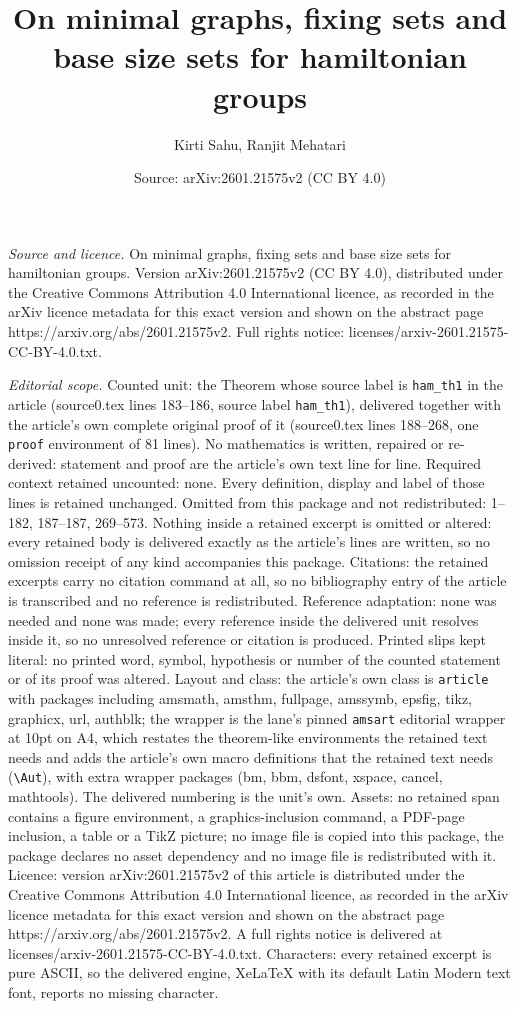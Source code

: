 \documentclass[10pt,a4paper]{amsart}
\title[On minimal graphs, fixing sets and base size sets for hamilt]{On minimal graphs, fixing sets and base size sets for hamiltonian groups}
\author{Kirti Sahu, Ranjit Mehatari}
\date{Source: arXiv:2601.21575v2 (CC BY 4.0)}
\begin{document}
\maketitle

\noindent\emph{Source and licence.} On minimal graphs, fixing sets and base size sets for hamiltonian groups. Version arXiv:2601.21575v2 (CC BY 4.0), distributed under the Creative Commons Attribution 4.0 International licence, as recorded in the arXiv licence metadata for this exact version and shown on the abstract page https://arxiv.org/abs/2601.21575v2. Full rights notice: licenses/arxiv-2601.21575-CC-BY-4.0.txt.\par\smallskip

\noindent\textit{Editorial scope.} Counted unit: the Theorem whose source label is \texttt{ham\_th1} in the article (source0.tex lines 183--186, source label \texttt{ham\_th1}), delivered together with the article's own complete original proof of it (source0.tex lines 188--268, one \texttt{proof} environment of 81 lines). No mathematics is written, repaired or re-derived: statement and proof are the article's own text line for line. Required context retained uncounted: none. Every definition, display and label of those lines is retained unchanged. Omitted from this package and not redistributed: 1--182, 187--187, 269--573. Nothing inside a retained excerpt is omitted or altered: every retained body is delivered exactly as the article's lines are written, so no omission receipt of any kind accompanies this package. Citations: the retained excerpts carry no citation command at all, so no bibliography entry of the article is transcribed and no reference is redistributed. Reference adaptation: none was needed and none was made; every reference inside the delivered unit resolves inside it, so no unresolved reference or citation is produced. Printed slips kept literal: no printed word, symbol, hypothesis or number of the counted statement or of its proof was altered. Layout and class: the article's own class is \texttt{article} with packages including amsmath, amsthm, fullpage, amssymb, epsfig, tikz, graphicx, url, authblk; the wrapper is the lane's pinned \texttt{amsart} editorial wrapper at 10pt on A4, which restates the theorem-like environments the retained text needs and adds the article's own macro definitions that the retained text needs (\texttt{\textbackslash Aut}), with extra wrapper packages (bm, bbm, dsfont, xspace, cancel, mathtools). The delivered numbering is the unit's own. Assets: no retained span contains a figure environment, a graphics-inclusion command, a PDF-page inclusion, a table or a TikZ picture; no image file is copied into this package, the package declares no asset dependency and no image file is redistributed with it. Licence: version arXiv:2601.21575v2 of this article is distributed under the Creative Commons Attribution 4.0 International licence, as recorded in the arXiv licence metadata for this exact version and shown on the abstract page https://arxiv.org/abs/2601.21575v2. A full rights notice is delivered at licenses/arxiv-2601.21575-CC-BY-4.0.txt. Characters: every retained excerpt is pure ASCII, so the delivered engine, XeLaTeX with its default Latin Modern text font, reports no missing character.
\end{document}
